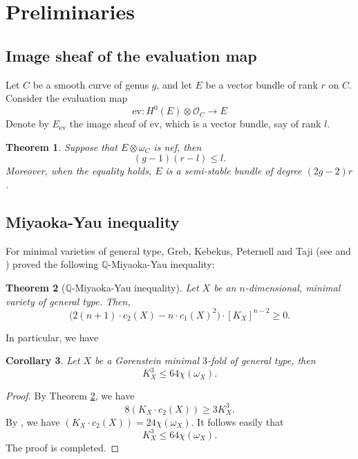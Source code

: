\documentclass[11pt]{amsart}
\theoremstyle{plain}
\newtheorem{thm}{Theorem}[section]
\newtheorem{cor}[thm]{Corollary}
\theoremstyle{definition}
\numberwithin{equation}{section}
\newcommand{\ev}{\mathrm{ev}}
\newcommand{\QQ}{\mathbb{Q}}
\newcommand{\sO}{\mathcal{O}}
\begin{document}
\section{Preliminaries}



\subsection{Image sheaf of the evaluation map}
Let $C$ be a smooth  curve of genus $g$, and let $E$ be a vector bundle of rank $r$ on $C$. Consider the evaluation map
\[
\ev\colon H^0(E)\otimes\sO_C\to E
\]
Denote by $E_{\ev}$ the image sheaf of $\ev$, which is a vector bundle, say of rank $l$.
\begin{thm}\cite[Proposition~page 476]{Xia86}\label{Xiao_Eev}
    Suppose that $E\otimes\omega_C$ is nef, then
    \[
    (g-1)(r-l)\leq l.
    \]
    Moreover, when the equality holds, $E$ is a semi-stable bundle of degree $(2g-2)r$.
\end{thm}

\subsection{Miyaoka-Yau inequality}

For minimal varieties of general type, Greb, Kebekus, Peternell and Taji (see \cite[Theorem 1.1]{GKPT19} and \cite[line 12 in \S 1.1, page 1488]{GKPT19}) proved the following $\QQ$-Miyaoka-Yau inequality:

\begin{thm}[$\mathbb{Q}$-Miyaoka-Yau inequality]\label{thm: MY1}
Let $X$ be an $n$-dimensional, minimal variety of general type. Then,
\begin{equation*}
\bigl(2(n+1)\cdot c_2(X) - n\cdot c_1(X)^2\bigr)\cdot [K_X]^{n-2} \geq 0.
\end{equation*}
\end{thm}
In particular, we have
\begin{cor}
    Let $X$ be a Gorenstein minimal $3$-fold of general type, then 
    \begin{equation}\label{MY}
        K_X^3\leq 64\chi(\omega_X).
    \end{equation}
   
\end{cor}
\begin{proof}
    By Theorem \ref{thm: MY1}, we have 
    $$
    8(K_X\cdot c_2(X))\geq 3K_X^3.
    $$
    By \cite[Corollary~10.3]{Rei87}, we have $(K_X\cdot c_2(X))=24\chi(\omega_X)$. It follows easily that 
    $$
    K_X^3\leq 64\chi(\omega_X).
    $$
    The proof is completed.
\end{proof}
\end{document}
